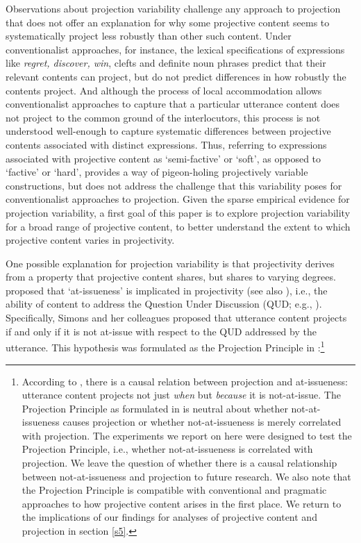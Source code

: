 \documentclass[11pt,fleqn]{article}
\newcommand{\6}{\mbox{$[\hspace*{-.6mm}[$}}
\newcommand{\9}{\mbox{$]\hspace*{-.6mm}]$}}
\begin{document}
Observations about projection variability challenge any approach to projection that does not offer an explanation for why some projective content seems to systematically project less robustly than other such content. Under conventionalist approaches, for instance, the lexical specifications of expressions like {\em regret, discover, win}, clefts and definite noun phrases predict that their relevant contents can project, but do not predict differences in how robustly the contents project. And although the process of local accommodation allows conventionalist approaches to capture that a particular utterance content does not project to the common ground of the interlocutors, this process is not understood well-enough to capture systematic differences between projective contents associated with distinct expressions. Thus, referring to expressions associated with projective content as `semi-factive' or `soft', as opposed to `factive' or `hard', provides a way of pigeon-holing projectively variable constructions, but does not address the challenge that this variability poses for conventionalist approaches to projection.  Given the sparse empirical evidence for projection variability, a first goal of this paper is to explore projection variability for a broad range of projective content, to better understand the extent to which projective content varies in projectivity. 

One possible explanation for projection variability is that projectivity derives from a property that projective content shares, but shares to varying degrees. \citet{brst-salt10} proposed that `at-issueness' is implicated in projectivity (see also \citealt{abrusan2011}), i.e., the ability of content to address the Question Under Discussion (QUD; e.g., \citealt{roberts12}).  Specifically, Simons and her colleagues proposed that utterance content projects if and only if it is not at-issue with respect to the QUD addressed by the utterance. This hypothesis was formulated as the Projection Principle in \citealt[280]{brst-ar}:\footnote{According to \citealt[315]{brst-salt10}, there is a causal relation between projection and at-issueness: utterance content projects not just {\em when} but {\em because} it is not-at-issue. The Projection Principle as formulated in \citealt{brst-ar} is neutral about whether not-at-issueness causes projection or whether not-at-issueness is merely correlated with projection. The experiments we report on here were designed to test the Projection Principle, i.e., whether not-at-issueness is correlated with projection. We leave the question of whether there is a causal relationship between not-at-issueness and projection to future research. We also note that the Projection Principle is compatible with conventional and pragmatic approaches to how projective content arises in the first place. We return to the implications of our findings for analyses of projective content and projection in section \ref{s5}.}
\end{document}
